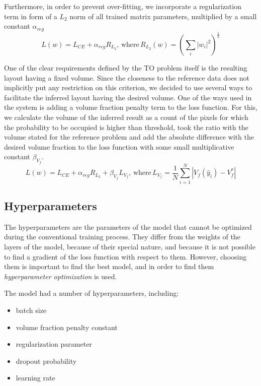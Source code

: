 Furthermore, in order to prevent over-fitting, we incorporate a regularization term in form of a $L_{2}$ norm of all trained matrix parameters, multiplied by a small constant $\alpha_{reg}$
\begin{equation}
 	L(w) = L_{CE} + \alpha_{reg} R_{L_{2}}, \, \mathrm{where} \, R_{L_{2}}(w) = ( \sum_{i}^{} |w_{i}|^{2} )^{\frac{1}{2}} 
\end{equation}
\medskip

One of the clear requirements defined by the TO problem itself is the resulting layout having a fixed volume. 
Since the closeness to the reference data does not implicitly put any restriction on this criterion, we decided to use several ways to facilitate the inferred layout having the desired volume.
One of the ways used in the system is adding a volume fraction penalty term to the loss function.
For this, we calculate the volume of the inferred result as a count of the pixels for which the probability to be occupied is higher than threshold, took the ratio with the volume stated for the reference problem and add the absolute difference with the desired volume fraction to the loss function with some small multiplicative constant $\beta_{V_{f}}$.
\begin{equation}
	L(w) = L_{CE} + \alpha_{reg} R_{L_{2}} + \beta_{V_{f}}  L_{V_{f}} , \, \mathrm{where} \, L_{V_{f}} = \frac{1}{N} \sum_{i=1}^{N} |V_{f}(\hat{y}_{i}) - V_{f}^{\ast}|
\end{equation}


\subsection{Hyperparameters}

The hyperparameters are the parameters of the model that cannot be optimized during the conventional training process.
They differ from the weights of the layers of the model, because of their special nature, and because it is not possible to find a gradient of the loss function with respect to them.
However, choosing them is important to find the best model, and in order to find them \textit{hyperparameter optimization} is used.
\medskip

The model had a number of hyperparameters, including:
\begin{itemize}
	\item batch size
	\item volume fraction penalty constant
	\item regularization parameter
	\item dropout probability 
	\item learning rate
\end{itemize}

